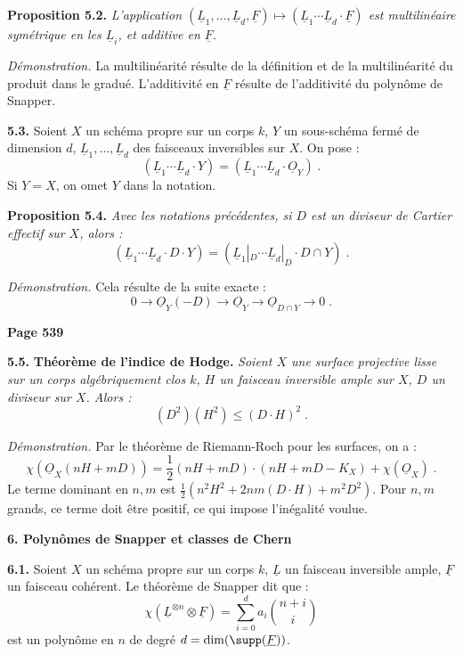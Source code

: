 \smallskip
\noindent\textbf{Proposition 5.2.} \textit{L'application $(\underline{L}_1, \ldots, \underline{L}_d, \underline{F}) \mapsto (\underline{L}_1 \cdots \underline{L}_d \cdot \underline{F})$ est multilin\'eaire sym\'etrique en les $\underline{L}_i$, et additive en $\underline{F}$.}

\textit{D\'emonstration.} La multilin\'earit\'e r\'esulte de la d\'efinition et de la multilin\'earit\'e du produit dans le gradu\'e. L'additivit\'e en $\underline{F}$ r\'esulte de l'additivit\'e du polyn\^ome de Snapper.

\smallskip
\noindent\textbf{5.3.} Soient $X$ un sch\'ema propre sur un corps $k$, $Y$ un sous-sch\'ema ferm\'e de dimension $d$, $\underline{L}_1, \ldots, \underline{L}_d$ des faisceaux inversibles sur $X$. On pose :
\[
(\underline{L}_1 \cdots \underline{L}_d \cdot Y) = (\underline{L}_1 \cdots \underline{L}_d \cdot \underline{O}_Y)\;.
\]
Si $Y = X$, on omet $Y$ dans la notation.

\smallskip
\noindent\textbf{Proposition 5.4.} \textit{Avec les notations pr\'ec\'edentes, si $D$ est un diviseur de Cartier effectif sur $X$, alors :
\[
(\underline{L}_1 \cdots \underline{L}_d \cdot D \cdot Y) = (\underline{L}_1|_D \cdots \underline{L}_d|_D \cdot D \cap Y)\;.
\]}

\textit{D\'emonstration.} Cela r\'esulte de la suite exacte :
\[
0 \longrightarrow \underline{O}_Y(-D) \longrightarrow \underline{O}_Y \longrightarrow \underline{O}_{D \cap Y} \longrightarrow 0\;.
\]

\newpage
\noindent\textbf{Page 539}

\smallskip
\noindent\textbf{5.5.} \textbf{Th\'eor\`eme de l'indice de Hodge.} \textit{Soient $X$ une surface projective lisse sur un corps alg\'ebriquement clos $k$, $H$ un faisceau inversible ample sur $X$, $D$ un diviseur sur $X$. Alors :
\[
(D^2)(H^2) \leq (D \cdot H)^2\;.
\]}

\textit{D\'emonstration.} Par le th\'eor\`eme de Riemann-Roch pour les surfaces, on a :
\[
\chi(\underline{O}_X(nH + mD)) = \frac{1}{2}(nH + mD) \cdot (nH + mD - K_X) + \chi(\underline{O}_X)\;.
\]
Le terme dominant en $n, m$ est $\frac{1}{2}(n^2 H^2 + 2nm (D \cdot H) + m^2 D^2)$. Pour $n, m$ grands, ce terme doit \^etre positif, ce qui impose l'in\'egalit\'e voulue.

\medskip
\noindent\textbf{6. Polyn\^omes de Snapper et classes de Chern}

\smallskip
\noindent\textbf{6.1.} Soient $X$ un sch\'ema propre sur un corps $k$, $\underline{L}$ un faisceau inversible ample, $\underline{F}$ un faisceau coh\'erent. Le th\'eor\`eme de Snapper dit que :
\[
\chi(\underline{L}^{\otimes n} \otimes \underline{F}) = \sum_{i=0}^d a_i \binom{n+i}{i}
\]
est un polyn\^ome en $n$ de degr\'e $d = \dim(\supp(\underline{F}))$.

